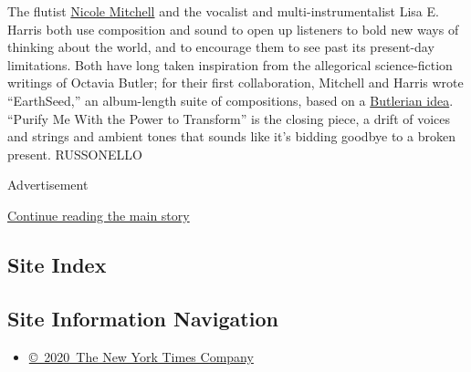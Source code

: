 The flutist
\href{https://www.nytimes.com/2018/01/10/arts/music/nicole-mitchell-black-earth-ensemble-mandorla-awakening.html}{Nicole
Mitchell} and the vocalist and multi-instrumentalist Lisa E. Harris both
use composition and sound to open up listeners to bold new ways of
thinking about the world, and to encourage them to see past its
present-day limitations. Both have long taken inspiration from the
allegorical science-fiction writings of Octavia Butler; for their first
collaboration, Mitchell and Harris wrote ``EarthSeed,'' an album-length
suite of compositions, based on a
\href{https://www.goodreads.com/series/57804-earthseed}{Butlerian idea}.
``Purify Me With the Power to Transform'' is the closing piece, a drift
of voices and strings and ambient tones that sounds like it's bidding
goodbye to a broken present. RUSSONELLO

Advertisement

\protect\hyperlink{after-bottom}{Continue reading the main story}

\hypertarget{site-index}{%
\subsection{Site Index}\label{site-index}}

\hypertarget{site-information-navigation}{%
\subsection{Site Information
Navigation}\label{site-information-navigation}}

\begin{itemize}
\tightlist
\item
  \href{https://help.nytimes.com/hc/en-us/articles/115014792127-Copyright-notice}{©~2020~The
  New York Times Company}
\end{itemize}

